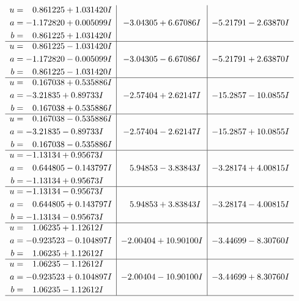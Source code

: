 \documentclass[1p]{elsarticle_modified}
\theoremstyle{definition}
\begin{document}
$$\begin{array}{c|c|c}
\begin{aligned}
u &= \phantom{-}0.861225 + 1.031420 I \\
a &= -1.172820 + 0.005099 I \\
b &= \phantom{-}0.861225 + 1.031420 I\end{aligned}
 & -3.04305 + 6.67086 I & -5.21791 - 2.63870 I \\ \hline\begin{aligned}
u &= \phantom{-}0.861225 - 1.031420 I \\
a &= -1.172820 - 0.005099 I \\
b &= \phantom{-}0.861225 - 1.031420 I\end{aligned}
 & -3.04305 - 6.67086 I & -5.21791 + 2.63870 I \\ \hline\begin{aligned}
u &= \phantom{-}0.167038 + 0.535886 I \\
a &= -3.21835 + 0.89733 I \\
b &= \phantom{-}0.167038 + 0.535886 I\end{aligned}
 & -2.57404 + 2.62147 I & -15.2857 - 10.0855 I \\ \hline\begin{aligned}
u &= \phantom{-}0.167038 - 0.535886 I \\
a &= -3.21835 - 0.89733 I \\
b &= \phantom{-}0.167038 - 0.535886 I\end{aligned}
 & -2.57404 - 2.62147 I & -15.2857 + 10.0855 I \\ \hline\begin{aligned}
u &= -1.13134 + 0.95673 I \\
a &= \phantom{-}0.644805 - 0.143797 I \\
b &= -1.13134 + 0.95673 I\end{aligned}
 & \phantom{-}5.94853 - 3.83843 I & -3.28174 + 4.00815 I \\ \hline\begin{aligned}
u &= -1.13134 - 0.95673 I \\
a &= \phantom{-}0.644805 + 0.143797 I \\
b &= -1.13134 - 0.95673 I\end{aligned}
 & \phantom{-}5.94853 + 3.83843 I & -3.28174 - 4.00815 I \\ \hline\begin{aligned}
u &= \phantom{-}1.06235 + 1.12612 I \\
a &= -0.923523 - 0.104897 I \\
b &= \phantom{-}1.06235 + 1.12612 I\end{aligned}
 & -2.00404 + 10.90100 I & -3.44699 - 8.30760 I \\ \hline\begin{aligned}
u &= \phantom{-}1.06235 - 1.12612 I \\
a &= -0.923523 + 0.104897 I \\
b &= \phantom{-}1.06235 - 1.12612 I\end{aligned}
 & -2.00404 - 10.90100 I & -3.44699 + 8.30760 I\\
 \hline 
 \end{array}$$\newpage\newpage\renewcommand{\arraystretch}{1}
\end{document}
